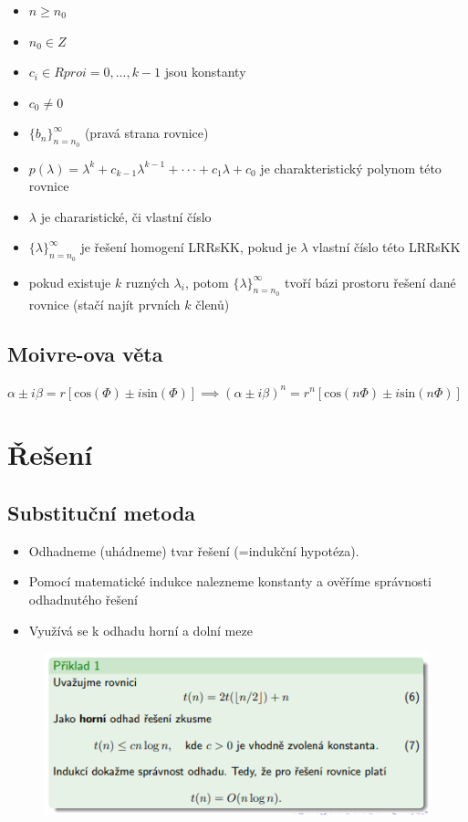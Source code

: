 \documentclass{szzclass}
\begin{document}
\begin{itemize}
    \item $n \geq n_0$
    \item $n_0 \in Z$
    \item $c_i \in R pro i = 0, . . . , k − 1$ jsou konstanty
    \item $c_0 \neq 0$
    \item $\{b_n\}^\infty_{n = n_0}$ (pravá strana rovnice)
    \item $p(\lambda) = \lambda^k + c_{k−1}\lambda^{k−1} + · · · + c_1\lambda + c_0$ je charakteristický polynom této rovnice
    \item $\lambda$ je chararistické, či vlastní číslo
    \item $\{\lambda\}^\infty_{n = n_0}$ je řešení homogení LRRsKK, pokud je $\lambda$ vlastní číslo této LRRsKK
    \item pokud existuje $k$ ruzných $\lambda_i$, potom $\{\lambda\}^\infty_{n = n_0}$ tvoří bázi prostoru řešení dané rovnice (stačí najít prvních $k$ členů)
\end{itemize}



\subsection{Moivre-ova věta}
$\alpha \pm i\beta = r[\text{cos}(\Phi) \pm i\text{sin}(\Phi)] \implies (\alpha \pm i\beta)^n = r^n[\text{cos}(n\Phi) \pm i\text{sin}(n\Phi)]$

\section{Řešení}

\subsection{Substituční metoda}

\begin{itemize}
    \item Odhadneme (uhádneme) tvar řešení (=indukční hypotéza).
    \item Pomocí matematické indukce nalezneme konstanty a ověříme
    správnosti odhadnutého řešení
    \item Využívá se k odhadu horní a dolní meze
\end{itemize}


\begin{figure}[h]
    \includegraphics[width=\textwidth, center]{topics/bi-spol-32/images/ind1.PNG}
\end{figure}
\end{document}

